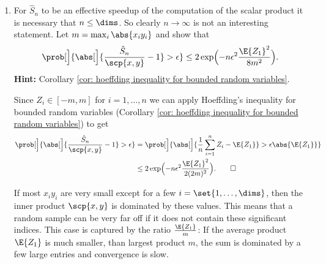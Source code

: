 \begin{exercise}
\begin{enumerate}[label=(\alph*), noitemsep]
        \item For \(\hat S_n\) to be an effective speedup of the
        computation of the scalar product it is necessary that \(n\le \dims\). So
        clearly \(n\to \infty\) is not an interesting statement.
        Let \(m = \max_i \abs{x_i y_i}\) and show that
        \[
            \prob[\Big]{\abs[\Big]{\frac{\hat S_n}{\scp{x,y}} - 1} > \epsilon}
            \le 2\exp\Bigl(-n \epsilon^2 \frac{\E{Z_1}^2}{8 m^2}\Bigr).
        \]
        \textbf{Hint:} Corollary \ref{cor: hoeffding inequality for bounded random variables}.
        \begin{solution}
            Since \(Z_i \in [-m,m]\) for \(i=1, \ldots, n\) we can apply
            Hoeffding's inequality for bounded random variables (Corollary \ref{cor:
            hoeffding inequality for bounded random variables}) to get
            \begin{align*}
                \prob[\Big]{\abs[\Big]{\frac{\hat S_n}{\scp{x,y}} - 1} > \epsilon}
                &=\prob[\Big]{\abs[\Big]{\frac1n\sum_{i=1}^n Z_i - \E{Z_1}} > \epsilon \abs{\E{Z_1}}}
                \\
                &\le 2\exp\Bigl(-n \epsilon^2 \frac{\E{Z_1}^2}{2(2m)^2}\Bigr).
                \qedhere
            \end{align*}
        \end{solution}
        \begin{remark}
            If most \(x_iy_i\) are very small except for a few \(i=\set{1,\dots, \dims}\),
            then the inner product \(\scp{x,y}\) is dominated by these values.
            This means that a random sample can be very far off if it does not
            contain these significant indices. This case is captured
            by the ratio \(\frac{\E{Z_1}}{m}\): If the average product
            \(\E{Z_1}\) is much smaller, than largest product \(m\), the sum is
            dominated by a few large entries and convergence is slow.
        \end{remark}


\end{enumerate}
\end{exercise}
